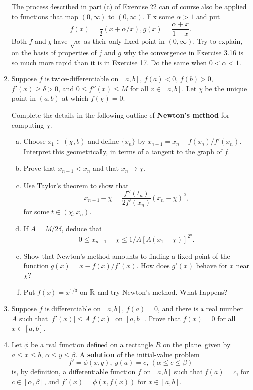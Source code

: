 \begin{enumerate}[1.]
    The process described in part (c) of Exercise 22 can of course also be applied to functions that map $(0, \infty)$ to $(0, \infty)$. Fix some $\alpha > 1$ and put
    \[
        f(x) = \frac{1}{2} \left( x + \alpha/x \right), g(x) = \frac{\alpha + x}{1 + x}.
    \]
    Both $f$ and $g$ have $\sqrt{\alpha}$ as their only fixed point in $(0, \infty)$. Try to explain, on the basis of properties of $f$ and $g$ why the convergence in Exercise 3.16 is so much more rapid than it is in Exercise 17. Do the same when $0 < \alpha < 1$.
\item %
    Suppose $f$ is twice-differentiable on $[a, b]$, $f(a) < 0$, $f(b) > 0$, $f'(x) \ge \delta > 0$, and $0 \le f''(x) \le M$ for all $x \in [a, b]$. Let $\chi$ be the unique point in $(a, b)$ at which $f(\chi) = 0$.

    Complete the details in the following outline of \textbf{Newton's method} for computing $\chi$.
    \begin{enumerate}[(a)]
        \item Choose $x_1 \in (\chi, b)$ and define $\{x_n\}$ by $x_{n+1} = x_n - f(x_n) / f'(x_n)$. Interpret this geometrically, in terms of a tangent to the graph of $f$.
        \item Prove that $x_{n+1} < x_n$ and that $x_n \to \chi$.
        \item Use Taylor's theorem to show that
            \[
                x_{n+1} - \chi = \frac{f''(t_n)}{2f'(x_n)} (x_n - \chi)^2,
            \]
            for some $t \in (\chi, x_n)$.
        \item If $A = M/2\delta$, deduce that
            \[
                0 \le x_{n+1} - \chi \le 1/A [A(x_1 - \chi)]^{2^n}.
            \]
        \item Show that Newton's method amounts to finding a fixed point of the function $g(x) = x - f(x)/f'(x)$. How does $g'(x)$ behave for $x$ near $\chi$?
        \item Put $f(x) = x^{1/3}$ on $\mathbb{R}$ and try Newton's method. What happens?
    \end{enumerate}
\item %
    Suppose $f$ is differentiable on $[a, b]$, $f(a) = 0$, and there is a real number $A$ such that $|f'(x)| \le A|f(x)|$ on $[a, b]$. Prove that $f(x) = 0$ for all $x \in [a, b]$. 
\item %
    Let $\phi$ be a real function defined on a rectangle $R$ on the plane, given by $a \le x \le b$, $\alpha \le y \le \beta$. A \textbf{solution} of the initial-value problem
    \[
        f' = \phi(x, y),\ y(a) = c,\ (\alpha \le c \le \beta)
    \]
    is, by definition, a differentiable function $f$ on $[a, b]$ such that $f(a) = c$, for $c \in [\alpha, \beta]$, and $f'(x) = \phi(x, f(x))$ for $x \in [a, b]$.


\end{enumerate}
